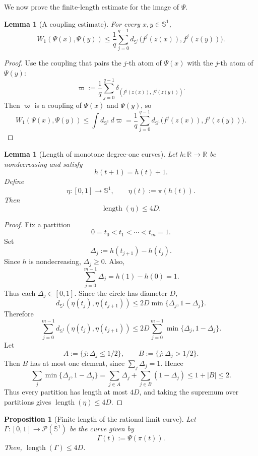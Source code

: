 \documentclass[12pt,a4paper,twoside]{article}
\theoremstyle{plain}
\newtheorem{proposition}[theorem]{Proposition}
\newtheorem{lemma}[theorem]{Lemma}
\theoremstyle{definition}
\newcommand{\cP}{{\mathcal P}}
\begin{document}
We now prove the finite-length estimate for the image of \(\Psi\).

\begin{lemma}[A coupling estimate]
\label{lem:rational-coupling}
For every \(x,y\in\mathbb S^1\),
\[
W_1(\Psi(x),\Psi(y))
\le
\frac1q\sum_{j=0}^{q-1}
d_{\mathbb S^1}\bigl(f^j(z(x)),f^j(z(y))\bigr).
\]
\end{lemma}

\begin{proof}
Use the coupling that pairs the \(j\)-th atom of \(\Psi(x)\) with the
\(j\)-th atom of \(\Psi(y)\):
\[
\varpi
:=
\frac1q\sum_{j=0}^{q-1}
\delta_{(f^j(z(x)),\,f^j(z(y)))}.
\]
Then \(\varpi\) is a coupling of \(\Psi(x)\) and \(\Psi(y)\), so
\[
W_1(\Psi(x),\Psi(y))
\le
\int d_{\mathbb S^1}\,d\varpi
=
\frac1q\sum_{j=0}^{q-1}
d_{\mathbb S^1}\bigl(f^j(z(x)),f^j(z(y))\bigr).
\]
\end{proof}

\begin{lemma}[Length of monotone degree-one curves]
\label{lem:monotone-degree-one-length}
Let \(h:\mathbb R\to\mathbb R\) be nondecreasing and satisfy
\[
h(t+1)=h(t)+1.
\]
Define
\[
\eta:[0,1]\to\mathbb S^1,
\qquad
\eta(t):=\pi(h(t)).
\]
Then
\[
\operatorname{length}(\eta)\le 4D.
\]
\end{lemma}

\begin{proof}
Fix a partition
\[
0=t_0<t_1<\cdots<t_m=1.
\]
Set
\[
\Delta_j:=h(t_{j+1})-h(t_j).
\]
Since \(h\) is nondecreasing, \(\Delta_j\ge0\). Also,
\[
\sum_{j=0}^{m-1}\Delta_j=h(1)-h(0)=1.
\]
Thus each \(\Delta_j\in[0,1]\). Since the circle has diameter \(D\),
\[
d_{\mathbb S^1}(\eta(t_j),\eta(t_{j+1}))
\le
2D\min\{\Delta_j,1-\Delta_j\}.
\]
Therefore
\[
\sum_{j=0}^{m-1}
d_{\mathbb S^1}(\eta(t_j),\eta(t_{j+1}))
\le
2D
\sum_{j=0}^{m-1}
\min\{\Delta_j,1-\Delta_j\}.
\]
Let
\[
A:=\{j:\Delta_j\le1/2\},
\qquad
B:=\{j:\Delta_j>1/2\}.
\]
Then \(B\) has at most one element, since \(\sum_j\Delta_j=1\). Hence
\[
\sum_j\min\{\Delta_j,1-\Delta_j\}
=
\sum_{j\in A}\Delta_j+\sum_{j\in B}(1-\Delta_j)
\le
1+|B|
\le2.
\]
Thus every partition has length at most \(4D\), and taking the supremum over
partitions gives $\operatorname{length}(\eta)\le4D$.
\end{proof}

\begin{proposition}[Finite length of the rational limit curve]
\label{prop:rational-limit-curve-length}
Let $\Gamma:[0,1]\to\cP(\mathbb S^1)$ be the curve given by
$$
\Gamma(t):=\Psi(\pi(t)).
$$
Then, $\operatorname{length}(\Gamma)\le4D$.
\end{proposition}
\end{document}
